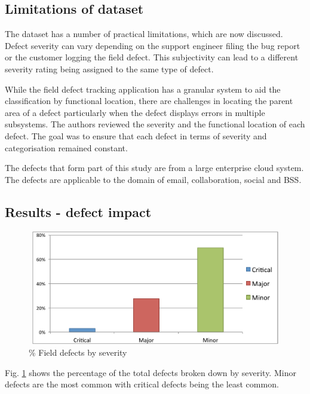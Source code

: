 \subsection{Limitations of dataset}

The dataset has a number of practical limitations, which are now discussed. Defect severity can vary depending on the support engineer filing the bug report or the customer logging the field defect. This subjectivity can lead to a different severity rating being assigned to the same type of defect. \par

While the field defect tracking application has a granular system to aid the classification by functional location, there are challenges in locating the parent area of a defect particularly when the defect displays errors in multiple subsystems.
The authors reviewed the severity and the functional location of each defect. The goal was to ensure that each defect in terms of severity and categorisation remained constant. \par

The defects that form part of this study are from a large enterprise cloud system. The defects are applicable to the domain of email, collaboration, social and BSS.

\subsection{Results - defect impact}

\begin{figure}
\begin{center}
\caption{\% Field defects by severity}
\label{fig:chapt3fig1}
\includegraphics[height=5cm, width=14cm]{graphs/social_test/graph1.pdf} 
\end{center}
\end{figure}

Fig. \ref{fig:chapt3fig1} shows the percentage of the total defects broken down by severity. Minor defects are the most common with critical defects being the least common.


